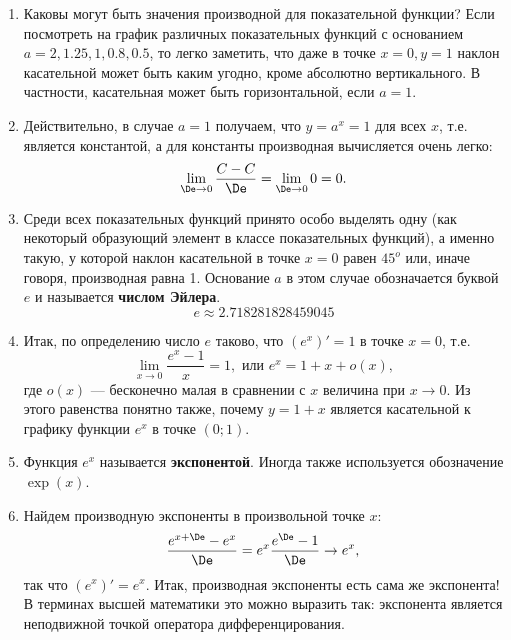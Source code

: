 \begin{enumerate}
\item Каковы могут быть значения производной для показательной функции? Если посмотреть на график различных показательных функций с основанием $a=2,1.25,1,0.8,0.5$, то легко заметить, что даже в точке $x=0, y=1$ наклон касательной может быть каким угодно, кроме абсолютно вертикального. В частности, касательная может быть горизонтальной, если $a=1$.
\item Действительно, в случае $a=1$ получаем, что $y=a^x=1$ для всех $x$, т.е. является константой, а для константы производная вычисляется очень легко:
$$
\lim_{\De\to 0}\frac{C-C}{\De}=\lim_{\De\to 0}0=0.
$$
\item Среди всех показательных функций принято особо выделять одну (как некоторый образующий элемент в классе показательных функций), а именно такую, у которой наклон касательной в точке $x=0$ равен $45^o$ или, иначе говоря, производная равна 1. Основание $a$ в этом случае обозначается буквой $e$ и называется \textbf{числом Эйлера}.
$$
e\approx 2.718281828459045
$$
\item Итак, по определению число $e$ таково, что $(e^x)'=1$ в точке $x=0$, т.е.
$$
\lim_{x\to 0}\frac{e^x-1}{x}=1,\mbox{ или }e^x=1+x+o(x),
$$
где $o(x)$ --- бесконечно малая в сравнении с $x$ величина при $x\to 0$. Из этого равенства понятно также, почему $y=1+x$ является касательной к графику функции $e^x$ в точке $(0;1)$.
\item Функция $e^x$ называется \textbf{экспонентой}. Иногда также используется обозначение $\exp(x)$.
\item Найдем производную экспоненты в произвольной точке $x$:
$$
\frac{e^{x+\De}-e^x}{\De}=e^x\frac{e^\De-1}{\De}\to e^x,
$$
так что $(e^x)'=e^x$. Итак, производная экспоненты есть сама же экспонента! В терминах высшей математики это можно выразить так: экспонента является неподвижной точкой оператора дифференцирования.





\end{enumerate}
